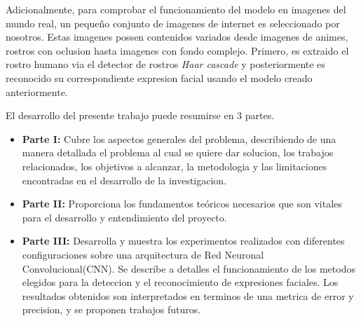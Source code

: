 Adicionalmente, para comprobar el funcionamiento del modelo en imagenes del mundo real, un pequeño conjunto de imagenes de internet es seleccionado por nosotros. Estas imagenes possen contenidos variados desde imagenes de animes, rostros con oclusion hasta imagenes con fondo complejo. Primero, es extraido el rostro humano via el detector de rostros \textit{Haar cascade} y posteriormente es reconocido su correspondiente expresion facial usando el modelo creado anteriormente.

El desarrollo del presente trabajo puede resumirse en 3 partes.

\begin{itemize}
\item \textbf{Parte I:} Cubre los aspectos generales del problema, describiendo de una manera detallada el problema al cual se quiere dar solucion, los trabajos relacionados, los objetivos a alcanzar, la metodologia y las limitaciones encontradas en el desarrollo de la investigacion.
\item \textbf{Parte II:} Proporciona los fundamentos teóricos necesarios que son vitales para el desarrollo y entendimiento del proyecto.
\item \textbf{Parte III:} Desarrolla y muestra los experimentos realizados con diferentes configuraciones sobre una arquitectura de Red Neuronal Convolucional(CNN). Se describe a detalles el funcionamiento de los metodos elegidos para la deteccion y el reconocimiento de expresiones faciales. Los resultados obtenidos son interpretados en terminos de una metrica de error y precision, y se proponen trabajos futuros.


 
 
  
\end{itemize}






